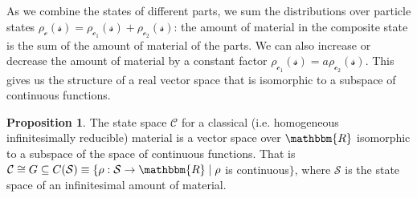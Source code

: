\documentclass[aps,pra,10pt,twocolumn,floatfix,nofootinbib]{revtex4-1}
\numberwithin{equation}{section}
\theoremstyle{definition}
\newtheorem{prop}[equation]{Proposition}
\begin{document}
As we combine the states of different parts, we sum the distributions over particle states $\rho_{\mathcal{c}}(\mathcal{s})=\rho_{\mathcal{c}_1}(\mathcal{s})+\rho_{\mathcal{c}_2}(\mathcal{s})$: the amount of material in the composite state is the sum of the amount of material of the parts. We can also increase or decrease the amount of material by a constant factor $\rho_{\mathcal{c}_1}(\mathcal{s})=a\rho_{\mathcal{c}_2}(\mathcal{s})$. This gives us the structure of a real vector space that is isomorphic to a subspace of continuous functions.

\begin{prop}\label{prop:real_vector_space}
The state space $\mathcal{C}$ for a classical (i.e. homogeneous infinitesimally reducible) material is a vector space over $\mathbbm{R}$ isomorphic to a subspace of the space of continuous functions. That is $\mathcal{C} \cong G \subseteq C(\mathcal{S}) \equiv \{\rho:\mathcal{S} \rightarrow \mathbbm{R} \; | \; \rho$ is continuous$\}$, where $\mathcal{S}$ is the state space of an infinitesimal amount of material.
\end{prop}
\end{document}

